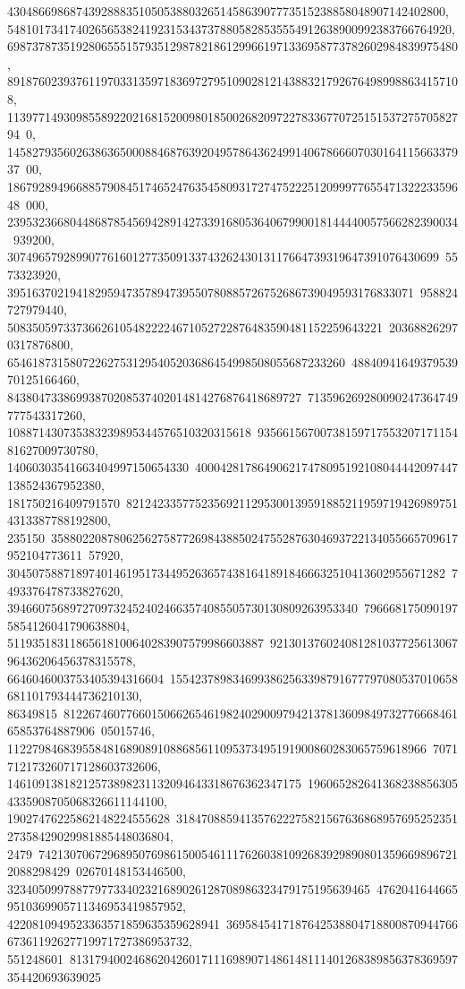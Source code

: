{{{   4304866986874392888351050538803265145863907773515238858048907142402800, 
   54810173417402656538241923153437378805828535554912638900992383766764920, 
   698737873519280655515793512987821861299661971336958773782602984839975480, 
   8918760239376119703313597183697279510902812143883217926764989988634157108, 
   11397714930985589220216815200980185002682097227833677072515153727570582794\
0, 
   14582793560263863650008846876392049578643624991406786660703016411566337937\
00, 
   18679289496688579084517465247635458093172747522251209997765547132223359648\
000, 239532366804486878545694289142733916805364067990018144440057566282390034\
939200, 307496579289907761601277350913374326243013117664739319647391076430699\
5573323920, 39516370219418295947357894739550780885726752686739049593176833071\
958824727979440, 508350597337366261054822224671052722876483590481152259643221\
203688262970317876800, 654618731580722627531295405203686454998508055687233260\
4884094164937953970125166460, 84380473386993870208537402014814276876418689727\
713596269280090247364749777543317260, 108871430735383239895344576510320315618\
9356615670073815971755320717115481627009730780, 14060303541663404997150654330\
400042817864906217478095192108044442097447138524367952380, 181750216409791570\
821242335775235692112953001395918852119597194269897514313387788192800, 235150\
35880220878062562758772698438850247552876304693722134055665709617952104773611\
57920, 3045075887189740146195173449526365743816418918466632510413602955671282\
7493376478733827620, 39466075689727097324524024663574085505730130809263953340\
7966681750901975854126041790638804, 51193518311865618100640283907579986603887\
92130137602408128103772561306796436206456378315578, 6646046003753405394316604\
1554237898346993862563398791677797080537010658681101793444736210130, 86349815\
81226746077660150662654619824029009794213781360984973277666846165853764887906\
05015746, 1122798468395584816890891088685611095373495191900860283065759618966\
7071712173260717128603732606, 14610913818212573898231132094643318676362347175\
1960652826413682388563054335908705068326611144100, 19027476225862148224555628\
31847088594135762227582156763686895769525235127358429029981885448036804, 2479\
74213070672968950769861500546111762603810926839298908013596698967212088298429\
02670148153446500, 3234050997887797733402321689026128708986323479175195639465\
47620416446659510369905711346953419857952, 4220810949523363571859635359628941\
369584541718764253880471880087094476667361192627719971727386953732, 551248601\
81317940024686204260171116989071486148111401268389856378369597354420693639025\
}}}
